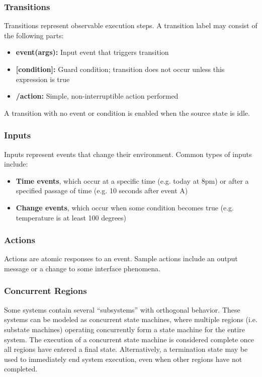 \documentclass[12pt,titlepage]{article}
\begin{document}
      \subsubsection{Transitions}
        Transitions represent observable execution steps. A transition label may consist of the following parts:
        \begin{itemize}
          \item \textbf{event(args):} Input event that triggers transition
          \item \textbf{[condition]:} Guard condition; transition does not occur unless this expression is true
          \item \textbf{/action:} Simple, non-interruptible action performed
        \end{itemize}
        A transition with no event or condition is enabled when the source state is idle.

      \subsubsection{Inputs}
        Inputs represent events that change their environment. Common types of inputs include:
        \begin{itemize}
          \item \textbf{Time events}, which occur at a specific time (e.g. today at 8pm) or after a specified passage of time (e.g. 10 seconds after event A)
          \item \textbf{Change events}, which occur when some condition becomes true (e.g. temperature is at least 100 degrees)
        \end{itemize}

      \subsubsection{Actions}
        Actions are atomic responses to an event. Sample actions include an output message or a change to some interface phenomena.

      \subsubsection{Concurrent Regions}
        Some systems contain several ``subsystems'' with orthogonal behavior. These systems can be modeled as concurrent state machines, where multiple
        regions (i.e. substate machines) operating concurrently form a state machine for the entire system. The execution of a concurrent state machine
        is considered complete once all regions have entered a final state. Alternatively, a termination state may be used to immediately end system
        execution, even when other regions have not completed.
\end{document}
